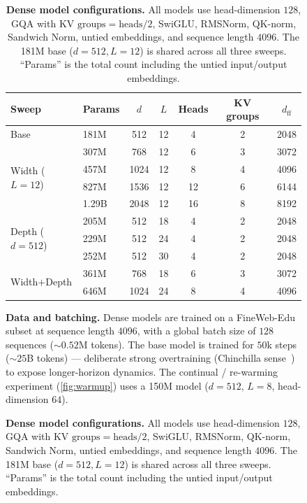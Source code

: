 \documentclass[10pt]{article} %
\begin{document}
\begin{figure}[t]
\begin{table}[t]
\centering
\small
\caption{\textbf{Dense model configurations.} All models use head-dimension $128$, GQA with $\text{KV groups}=\text{heads}/2$, SwiGLU, RMSNorm, QK-norm, Sandwich Norm, untied embeddings, and sequence length $4096$. The 181M base ($d=512,L=12$) is shared across all three sweeps. ``Params'' is the total count including the untied input/output embeddings.}
\label{tab:dense-arch}
\begin{tabular}{llccccc}
\toprule
Sweep & Params & $d$ & $L$ & Heads & KV groups & $d_{\text{ff}}$ \\
\midrule
Base                & 181M  & 512  & 12 & 4  & 2 & 2048 \\
\midrule
\multirow{4}{*}{Width ($L{=}12$)}
                    & 307M  & 768  & 12 & 6  & 3 & 3072 \\
                    & 457M  & 1024 & 12 & 8  & 4 & 4096 \\
                    & 827M  & 1536 & 12 & 12 & 6 & 6144 \\
                    & 1.29B & 2048 & 12 & 16 & 8 & 8192 \\
\midrule
\multirow{3}{*}{Depth ($d{=}512$)}
                    & 205M  & 512  & 18 & 4  & 2 & 2048 \\
                    & 229M  & 512  & 24 & 4  & 2 & 2048 \\
                    & 252M  & 512  & 30 & 4  & 2 & 2048 \\
\midrule
\multirow{2}{*}{Width$+$Depth}
                    & 361M  & 768  & 18 & 6  & 3 & 3072 \\
                    & 646M  & 1024 & 24 & 8  & 4 & 4096 \\
\bottomrule
\end{tabular}
\end{table}

\textbf{Data and batching.} Dense models are trained on a FineWeb-Edu~\citep{penedo2024fineweb} subset at sequence length $4096$, with a global batch size of $128$ sequences ($\sim$$0.52$M tokens). The base model is trained for $50$k steps ($\sim$$25$B tokens) --- deliberate strong overtraining (Chinchilla sense~\citep{hoffmann2022training}) to expose longer-horizon dynamics. The continual / re-warming experiment (\autoref{fig:warmup}) uses a 150M model ($d=512$, $L=8$, head-dimension $64$).


\end{figure}
\end{document}
